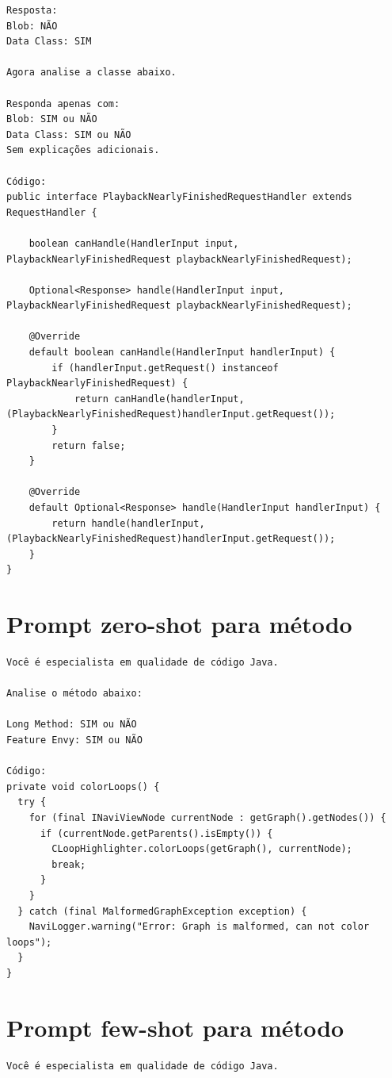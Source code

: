 \begin{apendicesenv}
\begin{verbatim}
Resposta:
Blob: NÃO
Data Class: SIM

Agora analise a classe abaixo.

Responda apenas com:
Blob: SIM ou NÃO
Data Class: SIM ou NÃO
Sem explicações adicionais.

Código:
public interface PlaybackNearlyFinishedRequestHandler extends RequestHandler {

	boolean canHandle(HandlerInput input, PlaybackNearlyFinishedRequest playbackNearlyFinishedRequest);

	Optional<Response> handle(HandlerInput input, PlaybackNearlyFinishedRequest playbackNearlyFinishedRequest);

	@Override
	default boolean canHandle(HandlerInput handlerInput) {
		if (handlerInput.getRequest() instanceof PlaybackNearlyFinishedRequest) {
			return canHandle(handlerInput, (PlaybackNearlyFinishedRequest)handlerInput.getRequest());
		}
		return false;
	}

	@Override
	default Optional<Response> handle(HandlerInput handlerInput) {
		return handle(handlerInput, (PlaybackNearlyFinishedRequest)handlerInput.getRequest());
	}
}
\end{verbatim}

\section{Prompt zero-shot para método}

\begin{verbatim}
Você é especialista em qualidade de código Java.

Analise o método abaixo:

Long Method: SIM ou NÃO
Feature Envy: SIM ou NÃO

Código:
private void colorLoops() {
  try {
	for (final INaviViewNode currentNode : getGraph().getNodes()) {
	  if (currentNode.getParents().isEmpty()) {
		CLoopHighlighter.colorLoops(getGraph(), currentNode);
		break;
	  }
	}
  } catch (final MalformedGraphException exception) {
	NaviLogger.warning("Error: Graph is malformed, can not color loops");
  }
}
\end{verbatim}

\section{Prompt few-shot para método}

\begin{verbatim}
Você é especialista em qualidade de código Java.


\end{verbatim}
\end{apendicesenv}
